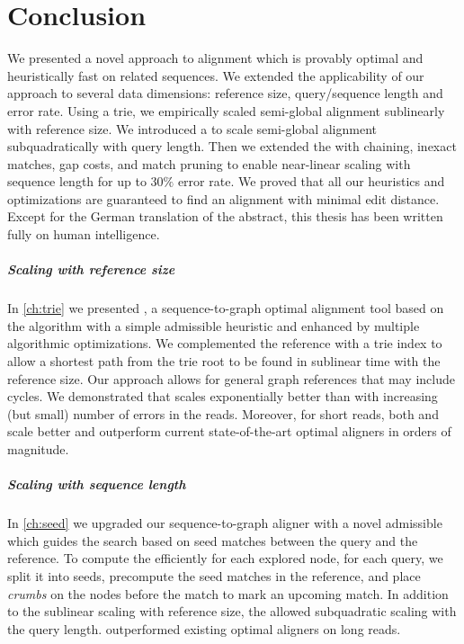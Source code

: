 \chapter*{Conclusion} \label{ch:conclusion}

We presented a novel \A approach to alignment which is provably optimal and
heuristically fast on related sequences. We extended the applicability of our
approach to several data dimensions: reference size, query/sequence length and
error rate. Using a trie, we empirically scaled semi-global alignment
sublinearly with reference size. We introduced a \emph{\sh} to scale semi-global
alignment subquadratically with query length. Then we extended the \sh with
chaining, inexact matches, gap costs, and match pruning to enable near-linear
scaling with sequence length for up to $30\%$ error rate. We proved that all our
heuristics and optimizations are guaranteed to find an alignment with minimal
edit distance. Except for the German translation of the abstract, this thesis
has been written fully on human intelligence.

\paragraph{Scaling with reference size}
In \cref{ch:trie} we presented \astarix, a sequence-to-graph optimal alignment
tool based on the \A algorithm with a simple admissible heuristic and enhanced
by multiple algorithmic optimizations. We complemented the reference with a trie
index to allow a shortest path from the trie root to be found in sublinear time
with the reference size. Our approach allows for general graph references that
may include cycles. We demonstrated that \astarix scales exponentially better
than \dijkstra with increasing (but small) number of errors in the reads.
Moreover, for short reads, both \astarix and \dijkstra scale better and
outperform current state-of-the-art optimal aligners in orders of magnitude.

\paragraph{Scaling with sequence length}
In \cref{ch:seed} we upgraded our sequence-to-graph aligner \astarix with a
novel admissible \emph{\sh} which guides the search based on seed matches
between the query and the reference. To compute the \sh efficiently for each
explored node, for each query, we split it into seeds, precompute the seed
matches in the reference, and place \emph{crumbs} on the nodes before the match
to mark an upcoming match. In addition to the sublinear scaling with reference
size, the \sh allowed subquadratic scaling with the query length. \astarix
outperformed existing optimal aligners on long reads.

